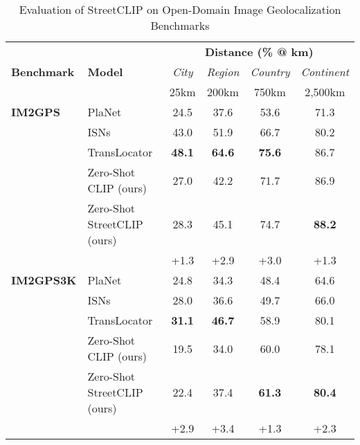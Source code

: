 \documentclass{article}
\renewcommand{\cite}[1]{\citep{#1}}
\begin{document}
\begin{table*}[t]
\caption{Evaluation of StreetCLIP on Open-Domain Image Geolocalization Benchmarks}
\label{table:ODIG}
\vskip 0.15in
\begin{center}
\begin{small}
\begin{sc}
\begin{tabular}{llcccc}
\toprule
& & \multicolumn{4}{c}{\textbf{Distance (\% @ km)}}\\
\textbf{Benchmark} & \textbf{Model} & \textit{City} & \textit{Region} & \textit{Country} & \textit{Continent} \\
& & 25km & 200km & 750km & 2,500km\\
\midrule
  \textbf{IM2GPS}  & PlaNet \cite{Weyand_2016} & 24.5 & 37.6 & 53.6 & 71.3\\
  & ISNs \cite{budack_2018} & 43.0 & 51.9 & 66.7 & 80.2\\
  &      TransLocator \cite{pramanick_2022}  & \textbf{48.1} & \textbf{64.6} & \textbf{75.6} & 86.7       \\
 \cmidrule{2-6}
                    &      Zero-Shot CLIP (ours)       &  27.0 & 42.2 & 71.7 & 86.9      \\
                    &      Zero-Shot StreetCLIP (ours)    &  28.3  & 45.1 & 74.7 & \textbf{88.2}       \\
\cmidrule{2-6}
                    & \textbf{} & +1.3 & +2.9 & +3.0 & +1.3\\
\midrule
\textbf{IM2GPS3K} & PlaNet \cite{Weyand_2016} & 24.8 & 34.3 & 48.4 & 64.6\\
 & ISNs \cite{budack_2018} &  28.0 & 36.6 & 49.7 & 66.0\\
& TransLocator \cite{pramanick_2022} & \textbf{31.1} &  \textbf{46.7} & 58.9 &  80.1       \\
 \cmidrule{2-6}
                    &      Zero-Shot CLIP (ours)      &  19.5 & 34.0 & 60.0 & 78.1       \\
                    &      Zero-Shot StreetCLIP (ours)    &  22.4  & 37.4 & \textbf{61.3} & \textbf{80.4}       \\
\cmidrule{2-6}
                    & \textbf{} & +2.9 & +3.4 & +1.3 & +2.3\\
\bottomrule

\end{tabular}
\end{sc}
\end{small}
\end{center}
\vskip -0.1in
\end{table*}
\end{document}

